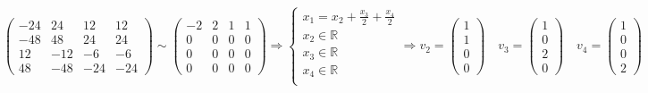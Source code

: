 \documentclass{article}
\begin{document}
$$\begin{pmatrix}
-24 & 24 & 12 & 12 \\
-48 & 48 & 24 & 24 \\
12 & -12 & -6 & -6 \\
48 & -48 & -24 & -24
\end{pmatrix} \sim \begin{pmatrix}
-2 & 2 & 1 & 1 \\
0 & 0 & 0 & 0 \\
0 & 0 & 0 & 0 \\
0 & 0 & 0 & 0
\end{pmatrix} \Rightarrow \begin{cases}
x_1 = x_2 + \frac{x_3}{2} + \frac{x_4}{2} \\
x_2 \in \mathbb{R} \\
x_3 \in \mathbb{R} \\
x_4 \in \mathbb{R} \\
\end{cases} \Rightarrow v_2 = \begin{pmatrix}
1 \\ 1 \\ 0 \\ 0
\end{pmatrix} \quad v_3 = \begin{pmatrix}
1 \\ 0 \\ 2 \\ 0
\end{pmatrix} \quad v_4 = \begin{pmatrix}
1 \\ 0 \\ 0 \\ 2
\end{pmatrix}$$ \\
\end{document}
